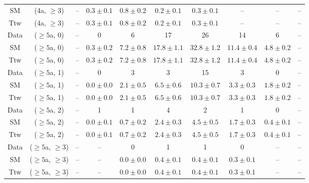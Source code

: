 \begin{table}[h!]
{\begin{tabular}{cccccccccc}
	SM & (4a, $\ge3$) & -- & $0.3\pm 0.1$ & $0.8\pm 0.2$ & $0.2\pm 0.1$ & $0.3\pm 0.1$ & -- & -- & -- \\[0.5ex] 
	Ttw & (4a, $\ge3$) & -- & $0.3\pm 0.1$ & $0.8\pm 0.2$ & $0.2\pm 0.1$ & $0.3\pm 0.1$ & -- & -- & -- \\[0.5ex] 
	Data & ($\ge5$a, 0) & -- & 0 & 6 & 17 & 26 & 14 & 6 & -- \\[0.5ex] 
	SM & ($\ge5$a, 0) & -- & $0.3\pm 0.2$ & $7.2\pm 0.8$ & $17.8\pm 1.1$ & $32.8\pm 1.2$ & $11.4\pm 0.4$ & $4.8\pm 0.2$ & -- \\[0.5ex] 
	Ttw & ($\ge5$a, 0) & -- & $0.3\pm 0.2$ & $7.2\pm 0.8$ & $17.8\pm 1.1$ & $32.8\pm 1.2$ & $11.4\pm 0.4$ & $4.8\pm 0.2$ & -- \\[0.5ex] 
	Data & ($\ge5$a, 1) & -- & 0 & 3 & 3 & 15 & 3 & 0 & -- \\[0.5ex] 
	SM & ($\ge5$a, 1) & -- & $0.0\pm 0.0$ & $2.1\pm 0.5$ & $6.5\pm 0.6$ & $10.3\pm 0.7$ & $3.3\pm 0.3$ & $1.8\pm 0.2$ & -- \\[0.5ex] 
	Ttw & ($\ge5$a, 1) & -- & $0.0\pm 0.0$ & $2.1\pm 0.5$ & $6.5\pm 0.6$ & $10.3\pm 0.7$ & $3.3\pm 0.3$ & $1.8\pm 0.2$ & -- \\[0.5ex] 
	Data & ($\ge5$a, 2) & -- & 1 & 1 & 4 & 2 & 1 & 0 & -- \\[0.5ex] 
	SM & ($\ge5$a, 2) & -- & $0.0\pm 0.1$ & $0.7\pm 0.2$ & $2.4\pm 0.3$ & $4.5\pm 0.5$ & $1.7\pm 0.3$ & $0.4\pm 0.1$ & -- \\[0.5ex] 
	Ttw & ($\ge5$a, 2) & -- & $0.0\pm 0.1$ & $0.7\pm 0.2$ & $2.4\pm 0.3$ & $4.5\pm 0.5$ & $1.7\pm 0.3$ & $0.4\pm 0.1$ & -- \\[0.5ex] 
	Data & ($\ge5$a, $\ge3$) & -- & -- & 0 & 1 & 1 & 0 & -- & -- \\[0.5ex] 
	SM & ($\ge5$a, $\ge3$) & -- & -- & $0.0\pm 0.0$ & $0.4\pm 0.1$ & $0.4\pm 0.1$ & $0.3\pm 0.1$ & -- & -- \\[0.5ex] 
	Ttw & ($\ge5$a, $\ge3$) & -- & -- & $0.0\pm 0.0$ & $0.4\pm 0.1$ & $0.4\pm 0.1$ & $0.3\pm 0.1$ & -- & -- \\[0.5ex] 
	\hline
	\hline
\end{tabular}}
\end{table}
